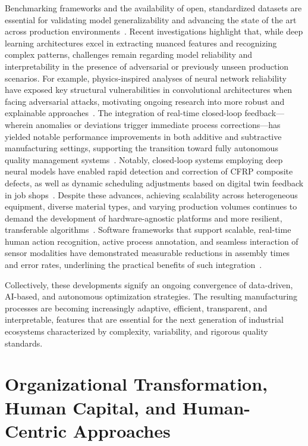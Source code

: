 \documentclass[sigconf]{acmart}
\begin{document}
Benchmarking frameworks and the availability of open, standardized datasets are essential for validating model generalizability and advancing the state of the art across production environments~\cite{ref46, ref48, ref53, ref95}. Recent investigations highlight that, while deep learning architectures excel in extracting nuanced features and recognizing complex patterns, challenges remain regarding model reliability and interpretability in the presence of adversarial or previously unseen production scenarios. For example, physics-inspired analyses of neural network reliability have exposed key structural vulnerabilities in convolutional architectures when facing adversarial attacks, motivating ongoing research into more robust and explainable approaches~\cite{ref2}. The integration of real-time closed-loop feedback—wherein anomalies or deviations trigger immediate process corrections—has yielded notable performance improvements in both additive and subtractive manufacturing settings, supporting the transition toward fully autonomous quality management systems~\cite{ref44, ref48, ref58}. Notably, closed-loop systems employing deep neural models have enabled rapid detection and correction of CFRP composite defects, as well as dynamic scheduling adjustments based on digital twin feedback in job shops~\cite{ref58, ref59}. Despite these advances, achieving scalability across heterogeneous equipment, diverse material types, and varying production volumes continues to demand the development of hardware-agnostic platforms and more resilient, transferable algorithms~\cite{ref46, ref53}. Software frameworks that support scalable, real-time human action recognition, active process annotation, and seamless interaction of sensor modalities have demonstrated measurable reductions in assembly times and error rates, underlining the practical benefits of such integration~\cite{ref46}.

Collectively, these developments signify an ongoing convergence of data-driven, AI-based, and autonomous optimization strategies. The resulting manufacturing processes are becoming increasingly adaptive, efficient, transparent, and interpretable, features that are essential for the next generation of industrial ecosystems characterized by complexity, variability, and rigorous quality standards.

\section{Organizational Transformation, Human Capital, and Human-Centric Approaches}
\end{document}
